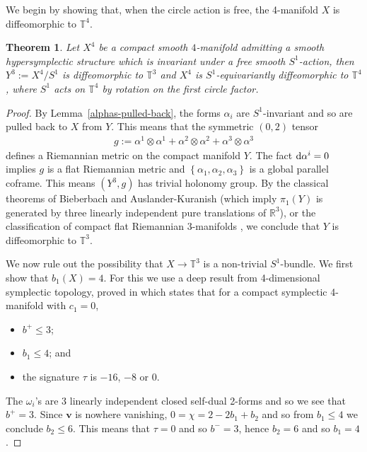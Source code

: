 \documentclass[11pt]{amsart}
\newcommand{\diff}{\text{\rm d}}
\theoremstyle{plain}
\newtheorem{theorem}{Theorem}
\theoremstyle{definition}
\theoremstyle{plain}
\theoremstyle{definition}
\numberwithin{equation}{section}
\numberwithin{theorem}{section}
\begin{document}
We begin by showing that, when the circle action is free, the 4-manifold $X$ is diffeomorphic to $\mathbb{T}^4$.

\begin{theorem}
\label{thm:standardization}
Let $X^4$ be a compact smooth $4$-manifold admitting a smooth hypersymplectic structure which is invariant under a free smooth $S^1$-action, then $Y^3:=X^4/S^1$ is diffeomorphic to $\mathbb{T}^3$ and $X^4$ is $S^1$-equivariantly diffeomorphic to $\mathbb{T}^4$, where $S^1$ acts on $\mathbb{T}^4$ by rotation on the first circle factor. 
\end{theorem}

\begin{proof}
By Lemma~\ref{alphas-pulled-back}, the forms $\alpha_i$ are $S^1$-invariant and so are pulled back to $X$ from $Y$. This means that  the symmetric $(0,2)$ tensor
    \begin{align*} 
    g:=\alpha^1\otimes \alpha^1+\alpha^2\otimes \alpha^2+\alpha^3\otimes \alpha^3
    \end{align*}
    defines a Riemannian metric on the compact manifold $Y$. The fact $\diff\alpha^i = 0$ implies $g$ is a flat Riemannian metric and $\left\{\alpha_1,\alpha_2,\alpha_3\right\}$ is a global parallel coframe. This means $\left(Y^3, g\right)$ has trivial holonomy group. By the classical theorems of Bieberbach and Auslander-Kuranish \cite{AK} (which imply $\pi_1(Y)$ is generated by three linearly independent pure translations of $\mathbb{R}^3$), or the classification of compact flat Riemannian $3$-manifolds \cite{Sc}, we conclude that $Y$ is diffeomorphic to $\mathbb{T}^3$. 

We now rule out the possibility that $X \to \mathbb{T}^3$ is a non-trivial $S^1$-bundle. We first show that $b_1(X)=4$. For this we use a deep result from 4-dimensional symplectic topology, proved in \cite{Li} which states that for a compact symplectic 4-manifold with $c_1=0$,
	\begin{itemize}
	\item $b^+ \leq 3$;
	\item $b_1 \leq 4$; and
	\item the signature $\tau$ is $-16$, $-8$ or $0$. 
	\end{itemize}
The $\omega_i$'s are 3 linearly independent closed self-dual 2-forms and so we see that $b^+ =3$. Since ${\bm v}$ is nowhere vanishing, $0= \chi = 2 - 2b_1 + b_2$ and so from $b_1 \leq 4$ we conclude $b_2 \leq 6$. This means that $\tau =0$ and so $b^-=3$, hence $b_2=6$ and so $b_1=4$. 


\end{proof}
\end{document}
